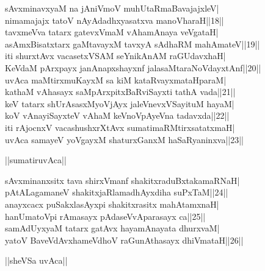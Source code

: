 \documentclass{article}
\begin{document}
sAvxminavxyaM na jAniVmoV muhUtaRmaBavajajxleV|\\
nimamajajx tatoV nAyAdadhxyasatxva manoVharaH||18||\\
tavxmeVva tatarx gatevxVmaM vAhamAnaya veVgataH|\\
asAmxBisatxtarx gaMtavayxM tavxyA sAdhaRM mahAmateV||19||\\
iti shurxtAvx vacasetxVSAM seYnikAnAM raGUdavxhaH|\\
KeVdaM pArxpayx janAnapxshayxnf jalasaMtaraNoVdayxtAnf||20||\\
uvAca maMtirxmuKayxM sa kiM kataRvayxmataHparaM|\\
kathaM vAhasayx saMpArxpitxBaRviSayxti tathA vada||21||\\
keV tatarx shUrAsasxMyoVjAyx jaleVnevxVSayituM hayaM|\\
koV vAnayiSayxteV vAhaM keVnoVpAyeVna tadavxda||22||\\
iti rAjocnxV vacashushxrXtAvx sumatimaRMtirxsatatxmaH|\\
uvAca samayeV yoVgayxM shaturxGanxM haSaRyaninxva||23||\\

\begin{center}
||sumatiruvAca||
\end{center}

sAvxminanxsitx tava shirxVmanf shakitxraduBxtakamaRNaH|\\
pAtALagamaneV shakitxjaRlamadhAyxdiha suPxTaM||24||\\
anayxcacx puSakxlasAyxpi shakitxrasitx mahAtamxnaH|\\
hanUmatoVpi rAmasayx pAdaseVvAparasayx ca||25||\\
samAdUyxyaM tatarx gatAvx hayamAnayata dhurxvaM|\\
yatoV BaveVdAvxhameVdhoV raGunAthasayx dhiVmataH||26||\\

\begin{center}
||sheVSa uvAca||
\end{center}
\end{document}
